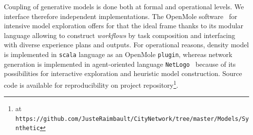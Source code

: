 Coupling of generative models is done both at formal and operational levels. We interface therefore independent implementations. The OpenMole software~\cite{reuillon2013openmole} for intensive model exploration offers for that the ideal frame thanks to its modular language allowing to construct \emph{workflows} by task composition and interfacing with diverse experience plans and outputs. For operational reasons, density model is implemented in \texttt{scala} language as an OpenMole \texttt{plugin}, whereas network generation is implemented in agent-oriented language \texttt{NetLogo}~\cite{wilensky1999netlogo} because of its possibilities for interactive exploration and heuristic model construction. Source code is available for reproducibility on project repository\footnote{at \texttt{https://github.com/JusteRaimbault/CityNetwork/tree/master/Models/Synthetic}}.





